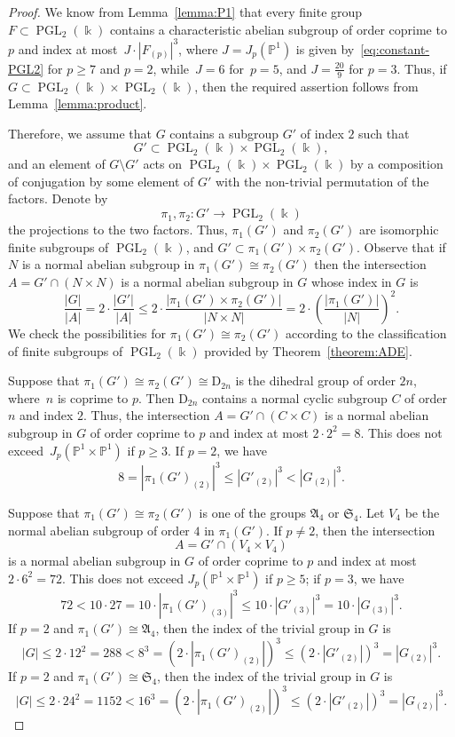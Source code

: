 \documentclass[12pt]{amsart}
\numberwithin{equation}{section}
\theoremstyle{definition}
\newcommand{\PP}{\mathbb P}
\newcommand{\DD}{\mathrm D}
\DeclareMathOperator{\PGL}{PGL}
\def \ge {\geqslant}
\def \le {\leqslant}
\begin{document}
\begin{proof}
We know from Lemma~\ref{lemma:P1} that every finite group $F\subset\PGL_2(\Bbbk)$
contains a characteristic abelian subgroup of order coprime to $p$ and index
at most~\mbox{$J\cdot |F_{(p)}|^3$}, where
$J=J_p(\PP^1)$ is given by~\eqref{eq:constant-PGL2} for $p\ge 7$ and $p=2$,
while~\mbox{$J=6$} for~\mbox{$p=5$}, and $J=\frac{20}{9}$ for $p=3$.
Thus, if $G\subset \PGL_2(\Bbbk)\times\PGL_2(\Bbbk)$, then the required
assertion follows from
Lemma~\ref{lemma:product}.

Therefore, we assume that $G$ contains a subgroup
$G'$ of index $2$ such that
$$
G'\subset \PGL_2(\Bbbk)\times\PGL_2(\Bbbk),
$$
and an element of $G\setminus G'$ acts on $\PGL_2(\Bbbk)\times\PGL_2(\Bbbk)$ by a composition
of conjugation by some element of $G'$ with the non-trivial permutation of the factors.
Denote by
$$
\pi_1, \pi_2\colon G'\to \PGL_2(\Bbbk)
$$
the projections to the two factors.
Thus, $\pi_1(G')$ and $\pi_2(G')$ are isomorphic finite subgroups of $\PGL_2(\Bbbk)$,
and $G'\subset \pi_1(G')\times\pi_2(G')$. Observe that
if $N$ is a normal abelian subgroup in $\pi_1(G')\cong\pi_2(G')$
then the intersection $A=G'\cap (N\times N)$ is a normal abelian subgroup in $G$
whose index in $G$ is
$$
\frac{|G|}{|A|}=2\cdot\frac{|G'|}{|A|}\le 2\cdot \frac{|\pi_1(G')\times\pi_2(G')|}{|N\times N|}=
2\cdot \left(\frac{|\pi_1(G')|}{|N|}\right)^2.
$$
We check the possibilities for $\pi_1(G')\cong\pi_2(G')$
according to the classification of finite subgroups of $\PGL_2(\Bbbk)$
provided by Theorem~\ref{theorem:ADE}.

Suppose that $\pi_1(G')\cong\pi_2(G')\cong\DD_{2n}$ is the dihedral group of order $2n$, where~$n$ is  coprime to $p$. Then $\DD_{2n}$ contains a normal cyclic subgroup $C$ of order~$n$ and index $2$.
Thus, the intersection $A=G'\cap (C\times C)$
is a normal abelian subgroup in $G$ of order coprime to $p$
and index at most $2\cdot 2^2=8$. This does not exceed~$J_p(\PP^1\times\PP^1)$ if $p\ge 3$.
If $p=2$, we have
$$
8=|\pi_1(G')_{(2)}|^3\le |G'_{(2)}|^3<|G_{(2)}|^3.
$$

Suppose that $\pi_1(G')\cong\pi_2(G')$ is one of the groups $\mathfrak{A}_4$ or $\mathfrak{S}_4$.
Let $V_4$ be the normal abelian subgroup of order $4$ in $\pi_1(G')$.
If $p\neq 2$, then the intersection
$$
A=G'\cap (V_4\times V_4)
$$
is a normal abelian
subgroup in $G$ of order coprime to $p$ and index at most~\mbox{$2\cdot 6^2=72$}.
This does not exceed $J_p(\PP^1\times\PP^1)$ if $p\ge 5$; if $p=3$, we have
$$
72<10\cdot 27=10\cdot |\pi_1(G')_{(3)}|^3\le 10\cdot |G'_{(3)}|^3=10\cdot |G_{(3)}|^3.
$$
If $p=2$ and $\pi_1(G')\cong\mathfrak{A}_4$, then the index of the trivial group in $G$ is
$$
|G|\le 2\cdot 12^2=288<8^3=(2\cdot |\pi_1(G')_{(2)}|)^3\le (2\cdot |G'_{(2)}|)^3=|G_{(2)}|^3.
$$
If $p=2$ and $\pi_1(G')\cong\mathfrak{S}_4$, then the index of the trivial group in $G$ is
$$
|G|\le 2\cdot 24^2=1152<16^3=(2\cdot |\pi_1(G')_{(2)}|)^3\le (2\cdot |G'_{(2)}|)^3=|G_{(2)}|^3.
$$


\end{proof}
\end{document}
